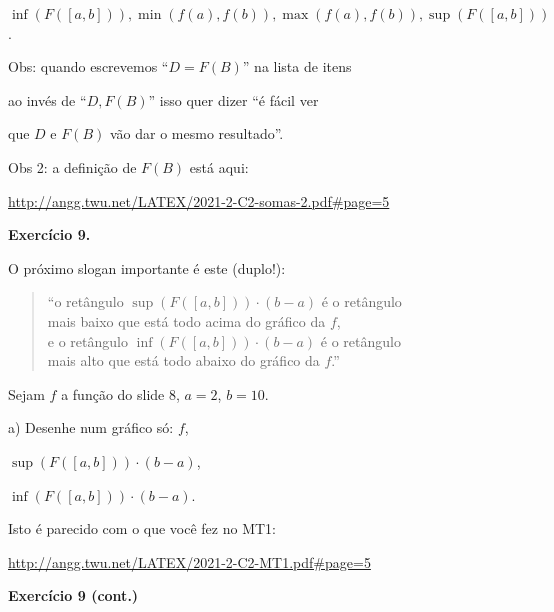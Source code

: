 \documentclass[oneside,12pt]{article}
\begin{document}
$\inf(F([a,b])), \min(f(a),f(b)), \max(f(a),f(b)), \sup(F([a,b]))$.

\bsk

Obs: quando escrevemos ``$D=F(B)$'' na lista de itens

ao invés de ``$D, F(B)$'' isso quer dizer ``é fácil ver

que $D$ e $F(B)$ vão dar o mesmo resultado''.

\msk

Obs 2: a definição de $F(B)$ está aqui:


{\footnotesize

\url{http://angg.twu.net/LATEX/2021-2-C2-somas-2.pdf#page=5}

}



\newpage

{\bf Exercício 9.}

O próximo slogan importante é este (duplo!):

\begin{quote}

``o retângulo $\sup(F([a,b]))·(b-a)$ é o retângulo \\
mais baixo que está todo acima do gráfico da $f$, \\
e o retângulo $\inf(F([a,b]))·(b-a)$ é o retângulo \\
mais alto que está todo abaixo do gráfico da $f$.''

\end{quote}

Sejam $f$ a função do slide 8, $a=2$, $b=10$.

\msk a) Desenhe num gráfico só: $f$,

$\sup(F([a,b]))·(b-a)$,

$\inf(F([a,b]))·(b-a)$.

\msk

Isto é parecido com o que você fez no MT1:


{\footnotesize

\url{http://angg.twu.net/LATEX/2021-2-C2-MT1.pdf#page=5}

}


\newpage

{\bf Exercício 9 (cont.)}
\end{document}
